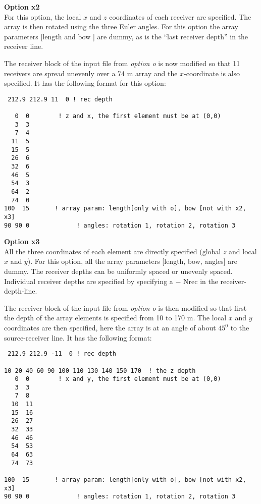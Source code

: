 \documentclass{saclantc}
\begin{document}
{\large \bf Option x2}\\
For this option, the local $x$ and $z$ coordinates of each receiver are
specified. The array is then rotated using the three Euler angles.
For this option the array parameters [length and bow ] are
dummy, as is the ``last receiver depth'' in the receiver line.

 The receiver block of the input file from {\it option o} is now
modified so that 11 receivers are spread unevenly over a 74 m array
and the $x$-coordinate is also specified.
It has the following format for this option:
\small
\begin{verbatim}
 212.9 212.9 11  0 ! rec depth

   0  0        ! z and x, the first element must be at (0,0) 
   3  3
   7  4
  11  5
  15  5
  26  6
  32  6
  46  5
  54  3
  64  2
  74  0
100  15       ! array param: length[only with o], bow [not with x2, x3]
90 90 0             ! angles: rotation 1, rotation 2, rotation 3
\end{verbatim}
\normalsize


{\large \bf Option x3}\\
All the three coordinates of each element are directly specified
(global $z$ and local $x$ and $y$).
For this option, all the array parameters [length, bow, angles] are
dummy. The receiver depths can be uniformly spaced or unevenly
spaced. Individual receiver depths are specified by
specifying a $-$ Nrec in the receiver-depth-line.

The receiver block of the input file from {\it option o} is then
modified so that first the depth of the array elements is specified
from 10 to 170 m.  The local $x$ and $y$ coordinates are then specified,
here the array is at an angle of about $45^0$ to the source-receiver
line.
It has the
following format:
\small
\begin{verbatim}
 212.9 212.9 -11  0 ! rec depth

10 20 40 60 90 100 110 130 140 150 170  ! the z depth
   0  0        ! x and y, the first element must be at (0,0) 
   3  3
   7  8
  10  11
  15  16
  26  27
  32  33
  46  46
  54  53
  64  63
  74  73

100  15       ! array param: length[only with o], bow [not with x2, x3]
90 90 0             ! angles: rotation 1, rotation 2, rotation 3
\end{verbatim}
\normalsize
\end{document}
